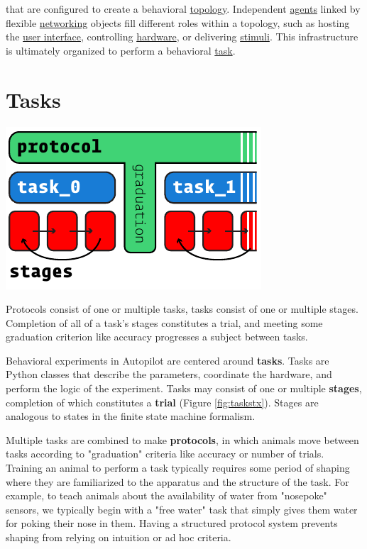 \documentclass[nohyper, justified, notitlepage, marginals=raggedright,twoside=false,debug]{tufte-autopilot}
\begin{document}
 that are configured to create a behavioral \hyperref[sec:topology]{topology}. Independent \hyperref[sec:agents]{agents} linked by flexible \hyperref[sec:networking]{networking} objects fill different roles within a topology, such as hosting the \hyperref[sec:ui]{user interface}, controlling \hyperref[sec:hardware]{hardware}, or delivering \hyperref[sec:stim]{stimuli}. This infrastructure is ultimately organized to perform a behavioral \hyperref[sec:tasks]{task}.

\section{Tasks}
\label{sec:tasks}
\begin{marginfigure}[5.9cm]
\includegraphics[]{figures/side_17_protocol.pdf}
\caption{Protocols consist of one or multiple tasks, tasks consist of one or multiple stages. Completion of all of a task's stages constitutes a trial, and meeting some graduation criterion like accuracy progresses a subject between tasks.}
\label{fig:taskstx}
\end{marginfigure}

Behavioral experiments in Autopilot are centered around \textbf{tasks}. Tasks are Python classes that describe the parameters, coordinate the hardware, and perform the logic of the experiment. Tasks may consist of one or multiple \textbf{stages}, completion of which constitutes a \textbf{trial} (Figure \ref{fig:taskstx}). Stages are analogous to states in the finite state machine formalism. 

Multiple tasks are combined to make \textbf{protocols}, in which animals move between tasks according to "graduation" criteria like accuracy or number of trials. Training an animal to perform a task typically requires some period of shaping where they are familiarized to the apparatus and the structure of the task. For example, to teach animals about the availability of water from "nosepoke" sensors, we typically begin with a "free water" task that simply gives them water for poking their nose in them. Having a structured protocol system prevents shaping from relying on intuition or ad hoc criteria.
\end{document}
